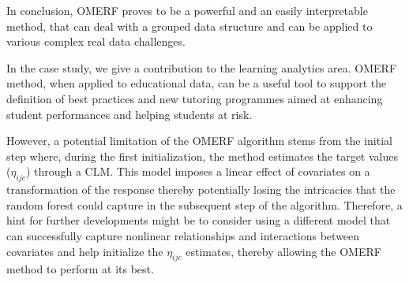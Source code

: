 In conclusion, OMERF proves to be a powerful and an easily interpretable method, that can deal with a grouped data structure and can be applied to various complex real data challenges.

In the case study, we give a contribution to the learning analytics area. OMERF method, when applied to educational data, can be a useful tool to support the definition of best practices and
new tutoring programmes aimed at enhancing student performances and helping students at risk. 


However, a potential limitation of the OMERF algorithm stems from the initial step where, during the first initialization, the method estimates the target values (\(\eta_{ijc}\)) through a CLM.
This model imposes a linear effect of covariates on a transformation of the response thereby potentially losing the intricacies that the random forest could capture in the subsequent step of the algorithm.
Therefore, a hint for further developments might be to consider using a different model that can successfully capture nonlinear relationships and interactions between covariates and help initialize the \(\eta_{ijc}\) estimates, thereby allowing the OMERF method to perform at its best.

